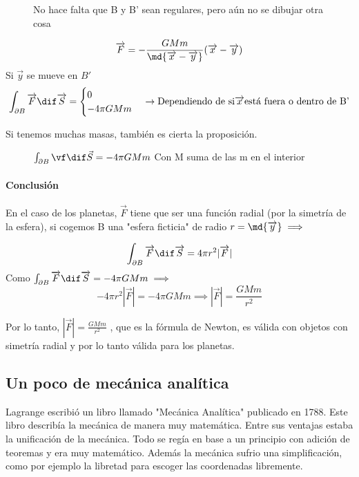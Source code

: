 \begin{figure}[hbtp]
	\centering
	\caption{No hace falta que B y B' sean regulares, pero aún no se dibujar otra cosa}
\end{figure}
$$\overrightarrow F = - \frac{GMm}{\md{\overrightarrow x - \overrightarrow y}}(\overrightarrow x - \overrightarrow y)$$
 Si $\overrightarrow y $ se mueve en $B'$
 $$\int_{\partial B} \overrightarrow F \dif \overrightarrow S =
 \begin{cases}
 0\\
 -4\pi GMm\\
 \end{cases}
 \rightarrow \text{Dependiendo de si} \overrightarrow x \text{está fuera o dentro de B'}$$

 Si tenemos muchas masas, también es cierta la proposición.\\

\begin{figure}[hbtp]
	\centering
	\caption{$\int_{\partial B} \vf \dif \vec{S} = -4\pi GMm $ Con M suma de las m en el interior}
\end{figure}
\newpage
\paragraph{Conclusión}
En el caso de los planetas, $\overrightarrow F$ tiene que ser una función radial (por la simetría de la esfera), si cogemos B una "esfera ficticia" de radio $r = \md{\overrightarrow y} \implies$
\begin{figure}[hbtp]
	\centering
\end{figure}
$$\int_{\partial B} \overrightarrow F \dif \overrightarrow S = 4 \pi r^2 |\overrightarrow F|$$
Como $\int_{\partial B} \overrightarrow F \dif \overrightarrow S = -4\pi GMm  \implies$
$$ - 4\pi r^2 |\overrightarrow F| = -4\pi GMm \implies |\overrightarrow F| = \frac{GMm}{r^2}$$

Por lo tanto, $|\overrightarrow F| = \frac{GMm}{r^2}$ , que es la fórmula de Newton, es válida con objetos con simetría radial y por lo tanto válida para los planetas.



\subsection{Un poco de mecánica analítica}
Lagrange escribió un libro llamado "Mecánica Analítica" publicado en 1788. Este libro describía la mecánica de manera muy matemática. Entre sus ventajas estaba la unificación de la mecánica. Todo se regía en base a un principio con adición de teoremas y era muy matemático. Además la mecánica sufrio una simplificación, como por ejemplo la libretad para escoger las coordenadas libremente.

